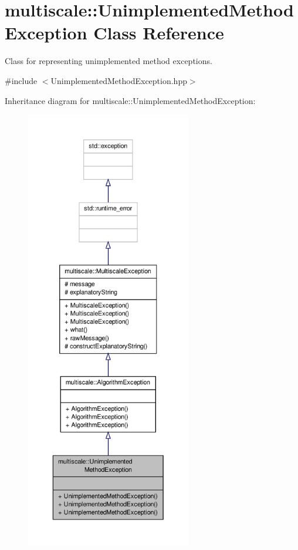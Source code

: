 \hypertarget{classmultiscale_1_1UnimplementedMethodException}{\section{multiscale\-:\-:Unimplemented\-Method\-Exception Class Reference}
\label{classmultiscale_1_1UnimplementedMethodException}
}


Class for representing unimplemented method exceptions.  




{\ttfamily \#include $<$Unimplemented\-Method\-Exception.\-hpp$>$}



Inheritance diagram for multiscale\-:\-:Unimplemented\-Method\-Exception\-:\nopagebreak
\begin{figure}[H]
\begin{center}
\leavevmode
\includegraphics[height=550pt]{classmultiscale_1_1UnimplementedMethodException__inherit__graph}
\end{center}
\end{figure}


